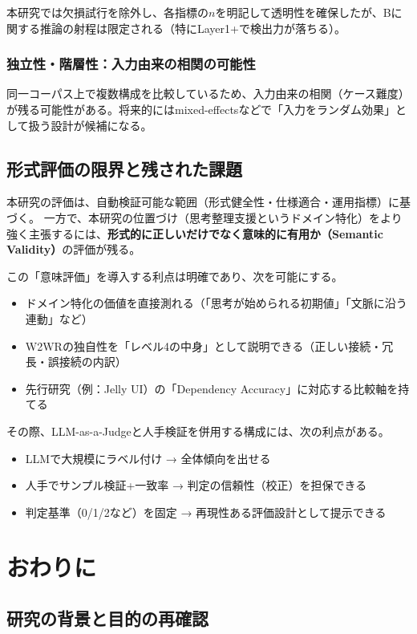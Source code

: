 \documentclass[senior,final,11pt,dvipdfmx]{iputit-thesis}
\begin{document}
本研究では欠損試行を除外し、各指標の$n$を明記して透明性を確保したが、Bに関する推論の射程は限定される（特にLayer1+で検出力が落ちる）。

\subsection{独立性・階層性：入力由来の相関の可能性}
\label{subsec:disc_threats_independence}

同一コーパス上で複数構成を比較しているため、入力由来の相関（ケース難度）が残る可能性がある。将来的にはmixed-effectsなどで「入力をランダム効果」として扱う設計が候補になる。

\section{形式評価の限界と残された課題}
\label{sec:disc_future}

本研究の評価は、自動検証可能な範囲（形式健全性・仕様適合・運用指標）に基づく。
一方で、本研究の位置づけ（思考整理支援というドメイン特化）をより強く主張するには、\textbf{形式的に正しいだけでなく意味的に有用か（Semantic Validity）}の評価が残る。

この「意味評価」を導入する利点は明確であり、次を可能にする。
\begin{itemize}
\item ドメイン特化の価値を直接測れる（「思考が始められる初期値」「文脈に沿う連動」など）
\item W2WRの独自性を「レベル4の中身」として説明できる（正しい接続・冗長・誤接続の内訳）
\item 先行研究（例：Jelly UI）の「Dependency Accuracy」に対応する比較軸を持てる
\end{itemize}

その際、LLM-as-a-Judgeと人手検証を併用する構成には、次の利点がある。
\begin{itemize}
\item LLMで大規模にラベル付け → 全体傾向を出せる
\item 人手でサンプル検証+一致率 → 判定の信頼性（校正）を担保できる
\item 判定基準（0/1/2など）を固定 → 再現性ある評価設計として提示できる
\end{itemize}


\chapter{おわりに}
\label{chap:conclusion}

\section{研究の背景と目的の再確認}
\label{sec:conc_plan}
\end{document}
